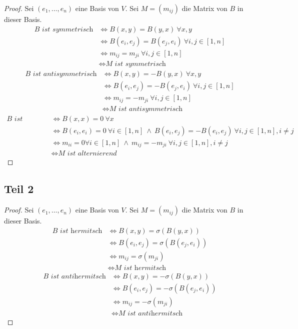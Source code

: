 \documentclass[10pt,a4paper]{article}
\begin{document}
\begin{proof}
Sei $(e_{1}, \dots, e_{n})$ eine Basis von $V$.
Sei $M = (m_{ij})$ die Matrix von $B$ in dieser Basis.
\begin{align*}
\textit{B ist symmetrisch} & \Leftrightarrow B(x, y) = B(y, x)\ \forall x, y\\
& \Leftrightarrow B(e_{i}, e_{j}) = B(e_{j}, e_{i})\ \forall i, j \in [1, n]\\
& \Leftrightarrow m_{ij} = m_{ji}\ \forall i, j \in [1, n]\\
& \Leftrightarrow \textit{M ist symmetrisch}
\end{align*}
\begin{align*}
\textit{B ist antisymmetrisch} & \Leftrightarrow B(x, y) = -B(y, x)\ \forall x, y\\
& \Leftrightarrow B(e_{i}, e_{j}) = -B(e_{j}, e_{i})\ \forall i, j \in [1, n]\\
& \Leftrightarrow m_{ij} = -m_{ji}\ \forall i, j \in [1, n]\\
& \Leftrightarrow \textit{M ist antisymmetrisch}
\end{align*}
\begin{align*}
\textit{B ist alternierend} & \Leftrightarrow B(x, x) = 0\ \forall x\\
& \Leftrightarrow B(e_{i}, e_{i}) = 0\ \forall i \in [1, n]\ \land\ B(e_{i}, e_{j}) = -B(e_{i}, e_{j})\ \forall i, j \in [1, n], i \ne j\\
& \Leftrightarrow m_{ii} = 0 \forall i \in [1, n]\ \land\ m_{ij} = -m_{ji}\ \forall i, j \in [1, n], i \ne j\\
& \Leftrightarrow \textit{M ist alternierend}
\end{align*}
\end{proof}

\subsection*{Teil 2}

\begin{proof}
Sei $(e_{1}, \dots, e_{n})$ eine Basis von $V$.
Sei $M = (m_{ij})$ die Matrix von $B$ in dieser Basis.
\begin{align*}
\textit{B ist hermitsch} & \Leftrightarrow B(x, y) = \sigma(B(y, x))\\
& \Leftrightarrow B(e_{i}, e_{j}) = \sigma(B(e_{j}, e_{i}))\\
& \Leftrightarrow m_{ij} = \sigma(m_{ji})\\
& \Leftrightarrow \textit{M ist hermitsch}
\end{align*}
\begin{align*}
\textit{B ist antihermitsch} & \Leftrightarrow B(x, y) = -\sigma(B(y, x))\\
& \Leftrightarrow B(e_{i}, e_{j}) = -\sigma(B(e_{j}, e_{i}))\\
& \Leftrightarrow m_{ij} = -\sigma(m_{ji})\\
& \Leftrightarrow \textit{M ist antihermitsch}
\end{align*}
\end{proof}
\end{document}
